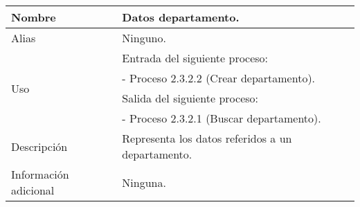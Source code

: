 \begin{center}
  \begin{tabular}{| l | p{9cm} |}
    \hline
    Nombre & \textbf{Datos departamento}.\\
    \hline
    Alias & Ninguno.\\
    \hline
    \multirow{4}{*}{Uso} & Entrada del siguiente proceso:\\
                         & - Proceso 2.3.2.2 (Crear departamento).\\
                         & Salida del siguiente proceso:\\
                         & - Proceso 2.3.2.1 (Buscar departamento).\\
    \hline
    Descripción & Representa los datos referidos a un departamento.\\
    \hline
    Información adicional & Ninguna.\\
    \hline
  \end{tabular}
\end{center}

